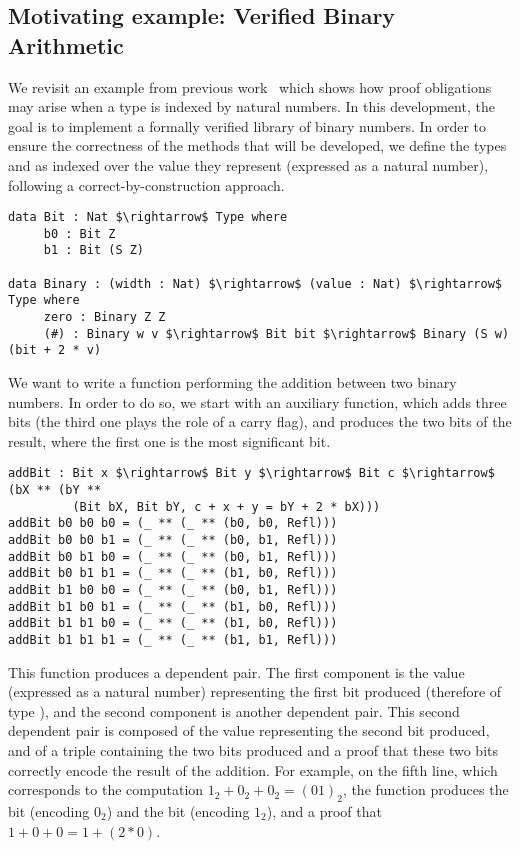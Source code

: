 \subsection{Motivating example: Verified Binary Arithmetic}
\label{sect:motivatingExample}

We revisit an example from previous work~\cite{DBLP:conf/plpv/Brady13} which shows how proof obligations may arise when a type is indexed by natural numbers. In this development, the goal is to implement a formally verified library of binary numbers. In order to ensure the correctness of the methods that will be developed, we define the types  and  as indexed over the value they represent (expressed as a natural number), following a correct-by-construction approach.

\begin{lstlisting}
data Bit : Nat $\rightarrow$ Type where
     b0 : Bit Z
     b1 : Bit (S Z)
     
data Binary : (width : Nat) $\rightarrow$ (value : Nat) $\rightarrow$ Type where
     zero : Binary Z Z
     (#) : Binary w v $\rightarrow$ Bit bit $\rightarrow$ Binary (S w) (bit + 2 * v)
\end{lstlisting}

We want to write a function performing the addition between two binary numbers. In order to do so, we start with an auxiliary function, which adds three bits
(the third one plays the role of a carry flag), and produces the two bits of
the result, where the first one is the most significant bit. 

\begin{lstlisting}
addBit : Bit x $\rightarrow$ Bit y $\rightarrow$ Bit c $\rightarrow$ (bX ** (bY ** 
         (Bit bX, Bit bY, c + x + y = bY + 2 * bX)))
addBit b0 b0 b0 = (_ ** (_ ** (b0, b0, Refl)))
addBit b0 b0 b1 = (_ ** (_ ** (b0, b1, Refl)))
addBit b0 b1 b0 = (_ ** (_ ** (b0, b1, Refl)))
addBit b0 b1 b1 = (_ ** (_ ** (b1, b0, Refl)))
addBit b1 b0 b0 = (_ ** (_ ** (b0, b1, Refl)))
addBit b1 b0 b1 = (_ ** (_ ** (b1, b0, Refl)))
addBit b1 b1 b0 = (_ ** (_ ** (b1, b0, Refl)))
addBit b1 b1 b1 = (_ ** (_ ** (b1, b1, Refl)))
\end{lstlisting}

This function produces a dependent pair. The first component is the value  (expressed as a natural number) representing the first bit produced (therefore of type ), and the second component is another dependent pair. This second dependent pair is composed of the value  representing the second bit produced, and of a triple containing the two bits produced and a proof that these two bits correctly encode the result of the addition.
For example, on the fifth line, which corresponds to the computation $1_2 + 0_2 + 0_2 = (01)_2$, the function produces the bit  (encoding $0_2$) and the bit  (encoding $1_2$), and a proof that $1 + 0 + 0 = 1 + (2*0)$.


